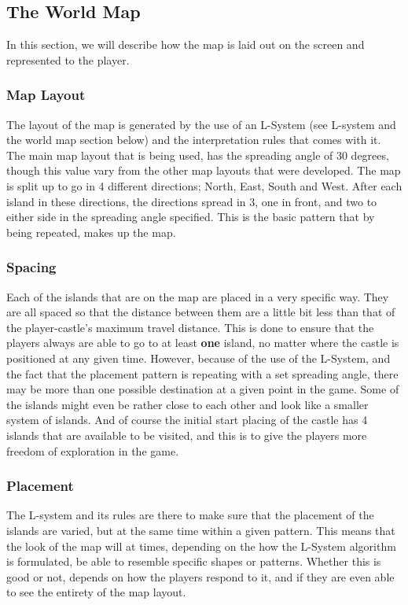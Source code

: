 \subsection{The World Map}
In this section, we will describe how the map is laid out on the screen and represented to the player.

\subsubsection{Map Layout}
The layout of the map is generated by the use of an L-System (see L-system and the world map section below) and the interpretation rules that comes with it. The main map layout that is being used, has the spreading angle of 30 degrees, though this value vary from the other map layouts that were developed. The map is split up to go in 4 different directions; North, East, South and West. After each island in these directions, the directions spread in 3, one in front, and two to either side in the spreading angle specified. This is the basic pattern that by being repeated, makes up the map.

\subsubsection{Spacing}
Each of the islands that are on the map are placed in a very specific way. They are all spaced so that the distance between them are a little bit less than that of the player-castle's maximum travel distance. This is done to ensure that the players always are able to go to at least \textbf{one} island, no matter where the castle is positioned at any given time. However, because of the use of the L-System, and the fact that the placement pattern is repeating with a set spreading angle, there may be more than one possible destination at a given point in the game. Some of the islands might even be rather close to each other and look like a smaller system of islands. And of course the initial start placing of the castle has 4 islands that are available to be visited, and this is to give the players more freedom of exploration in the game.

\subsubsection{Placement}
The L-system and its rules are there to make sure that the placement of the islands are varied, but at the same time within a given pattern. This means that the look of the map will at times, depending on the how the L-System algorithm is formulated, be able to resemble specific shapes or patterns. Whether this is good or not, depends on how the players respond to it, and if they are even able to see the entirety of the map layout.

